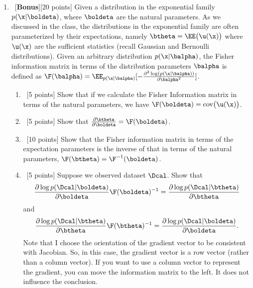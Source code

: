 \documentclass[12pt, fullpage,letterpaper]{article}
\begin{document}
\begin{enumerate}
\item~[\textbf{Bonus}][20 points] Given a distribution in the exponential family $p(\x|\boldeta)$, where $\boldeta$ are the natural parameters. As we discussed in the class, the distributions in the exponential family are often parameterized by their expectations, namely $\btheta = \EE\big(\u(\x)\big)$ where $\u(\x)$ are the sufficient statistics (recall Gaussian and Bernoulli distributions). Given an arbitrary distribution $p(\x|\balpha)$, the Fisher information matrix in terms of the distribution parameters $\balpha$ is defined as $\F(\balpha) = \EE_{p(\x|\balpha)}[- \frac{\partial^2 \log(p(\x|\balpha)) }{\partial \balpha^2}]$. 
\begin{enumerate}
	\item~[5 points] Show that if we calculate the Fisher Information matrix in terms of the natural parameters, we have $\F(\boldeta) = \mathrm{cov}\big(\u(\x)\big)$.
	\item~[5 points] Show that $\frac{\partial \btheta}{\partial \boldeta} = \F(\boldeta)$.
	\item~[10 points] Show that the Fisher information matrix in terms of the expectation parameters is the inverse of that in terms of the natural parameters, $\F(\btheta) =\F^{-1}(\boldeta) $.
	\item~[5 points] Suppose we observed dataset $\Dcal$. Show that
	\[
	\frac{\partial \log p(\Dcal|\boldeta)}{\partial \boldeta} \F(\boldeta)^{-1} = \frac{\partial \log p(\Dcal|\btheta)}{\partial \btheta}
	\]
	and 
	\[
	 \frac{\partial \log p(\Dcal|\btheta)}{\partial \btheta}\F(\btheta)^{-1} = \frac{\partial \log p(\Dcal|\boldeta)}{\partial \boldeta}.
	\]
	Note that I choose the orientation of the gradient vector to be consistent with Jacobian. So, in this case, the gradient vector is a row vector (rather than a column vector). If you want to use a column vector to represent the gradient, you can move the information matrix to the left. It does not influence the conclusion. 
\end{enumerate}
\end{enumerate}
\end{document}
